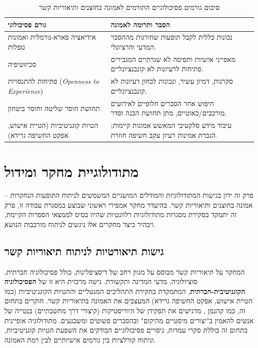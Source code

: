 \documentclass[12pt,a4paper]{article}
\begin{document}
\begin{table}[ht!]
    \centering
    \caption{סיכום גורמים פסיכולוגיים התורמים לאמונה בחוצנים ותיאוריות קשר}
    \label{tab:psych_factors}
    \begin{tabular}{|l|l|}
    \hline
    \textbf{גורם פסיכולוגי} & \textbf{הסבר ותרומה לאמונה} \\
    \hline
    אידיאציה פארא-נורמלית ואמונות טפלות & נכונות כללית לקבל תופעות שחורגות מההסבר המדעי והרציונלי. \\
    סכיזוטיפיה & מאפייני אישיות ותפיסה לא שגרתיים המגבירים פתיחות לרעיונות לא קונבנציונליים. \\
    פתיחות להתנסויות (\textit{Openness to Experience}) & סקרנות, דמיון עשיר, ונכונות לבחון רעיונות לא קונבנציונליים. \\
    תחושת חוסר שליטה \newline וחוסר ביטחון & חיפוש אחר הסברים חלופיים לאירועים מורכבים/כאוטיים, מתן תחושת הבנה וסדר. \\
    הטיות קוגניטיביות (הטיית אישוש, אפקט החשיפה גרידא) & עיבוד מידע סלקטיבי המאשש אמונות קיימות; הגברת אמינות רעיון עקב חשיפה חוזרת. \\
    \hline
    \end{tabular}
\end{table}

\section{מתודולוגיית מחקר ומידול}

פרק זה ידון בגישות המתודולוגיות והמודלים המושגיים המשמשים לניתוח התופעות הנחקרות – אמונה בחוצנים ותיאוריות קשר. בהיעדר מחקר אמפירי ראשוני שבוצע במסגרת עבודה זו, פרק זה יתמקד בסקירת מסגרות מתודולוגיות רלוונטיות שהיוו בסיס לממצאי הספרות הקיימת, ויבהיר כיצד מחקרים אלו ניגשים לניתוח מורכבות הנושא.

\subsection{גישות תיאורטיות לניתוח תיאוריות קשר}
המחקר על תיאוריות קשר מבוסס על מגוון רחב של דיסציפלינות, כולל פסיכולוגיה חברתית, סוציולוגיה, מדעי המדינה ותקשורת. גישה מרכזית היא זו של \textbf{הפסיכולוגיה הקוגניטיבית-חברתית}, המתמקדת בחקירת התהליכים המנטליים וההטיות הקוגניטיביות (כמו הטיית אישוש, אפקט החשיפה גרידא) המעצבים את האמונה בתיאוריות קשר. חוקרים בתחום זה, כמו קהנמן \cite{Wojcik2021Kahneman2011}, מדגישים את תפקידן של היוריסטיקות (קיצורי דרך מחשבתיים) בנטייה של אנשים להאמין ב"יצורים מיסטיים מהיקום" ובהסברים פשוטים ומשכנעים. מתודולוגיה אופיינית בתחום זה כוללת סקרי עמדות, ניסויים פסיכולוגיים הבודקים את השפעת הטיות קוגניטיביות, וניתוח קורלציות בין גורמים אישיותיים לבין רמת האמונה.
\end{document}
